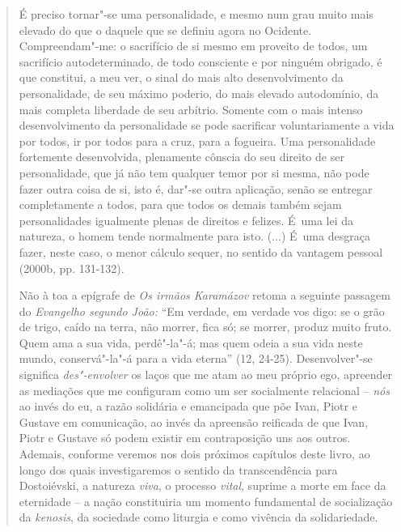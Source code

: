 {\begin{quote}
É preciso tornar"-se uma personalidade, e mesmo num grau muito mais
elevado do que o daquele que se definiu agora no Ocidente.
Compreendam"-me: o sacrifício de si mesmo em proveito de todos, um
sacrifício autodeterminado, de todo consciente e por ninguém obrigado, é
que constitui, a meu ver, o sinal do mais alto desenvolvimento da
personalidade, de seu máximo poderio, do mais elevado autodomínio, da
mais completa liberdade de seu arbítrio. Somente com o mais intenso
desenvolvimento da personalidade se pode sacrificar voluntariamente a
vida por todos, ir por todos para a cruz, para a fogueira. Uma
personalidade fortemente desenvolvida, plenamente cônscia do seu direito
de ser personalidade, que já não tem qualquer temor por si mesma, não
pode fazer outra coisa de si, isto é, dar"-se outra aplicação, senão se
entregar completamente a todos, para que todos os demais também sejam
personalidades igualmente plenas de direitos e felizes. É~uma lei da
natureza, o homem tende normalmente para isto. (...) É~uma desgraça
fazer, neste caso, o menor cálculo sequer, no sentido da vantagem
pessoal (2000b, pp. 131-132).

Não à toa a epígrafe de \emph{Os irmãos Karamázov} retoma a seguinte
passagem do \emph{Evangelho segundo João:} ``Em verdade, em verdade vos
digo: se o grão de trigo, caído na terra, não morrer, fica só; se
morrer, produz muito fruto. Quem ama a sua vida, perdê"-la"-á; mas quem
odeia a sua vida neste mundo, conservá"-la"-á para a vida eterna'' (12,
24-25). Desenvolver"-se significa \emph{des"-envolver} os laços que me
atam ao meu próprio ego, apreender as mediações que me configuram como
um ser socialmente relacional -- \emph{nós} ao invés do eu, a razão
solidária e emancipada que põe Ivan, Piotr e Gustave em comunicação, ao
invés da apreensão reificada de que Ivan, Piotr e Gustave só podem
existir em contraposição uns aos outros. Ademais, conforme veremos nos
dois próximos capítulos deste livro, ao longo dos quais investigaremos o
sentido da transcendência para Dostoiévski, a natureza \emph{viva}, o
processo \emph{vital}, suprime a morte em face da eternidade -- a nação
constituiria um momento fundamental de socialização da \emph{kenosis},
da sociedade como liturgia e como vivência da solidariedade.


\end{quote}}
